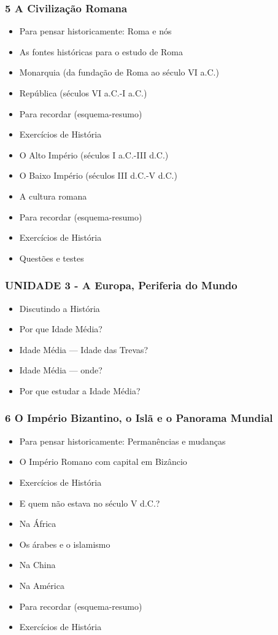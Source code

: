 \documentclass[a4paper,12pt]{article}[abntex2]
\begin{document}
\subsubsection*{5 A Civilização Romana}

\begin{itemize}
\item Para pensar historicamente: Roma e nós
\item As fontes históricas para o estudo de Roma
\item Monarquia (da fundação de Roma ao século VI a.C.)
\item República (séculos VI a.C.-I a.C.)
\item Para recordar (esquema-resumo)
\item Exercícios de História
\item O Alto Império (séculos I a.C.-III d.C.)
\item O Baixo Império (séculos III d.C.-V d.C.)
\item A cultura romana
\item Para recordar (esquema-resumo)
\item Exercícios de História
\item Questões e testes
\end{itemize}
\subsubsection*{UNIDADE 3 - A Europa, Periferia do Mundo}

\begin{itemize}
\item Discutindo a História
\item Por que Idade Média?
\item Idade Média — Idade das Trevas?
\item Idade Média — onde?
\item Por que estudar a Idade Média?
\end{itemize}
\subsubsection*{6 O Império Bizantino, o Islã e o Panorama Mundial}

\begin{itemize}
\item Para pensar historicamente: Permanências e mudanças
\item O Império Romano com capital em Bizâncio
\item Exercícios de História
\item E quem não estava no século V d.C.?
\item Na África
\item Os árabes e o islamismo
\item Na China
\item Na América
\item Para recordar (esquema-resumo)
\item Exercícios de História
\end{itemize}
\end{document}

